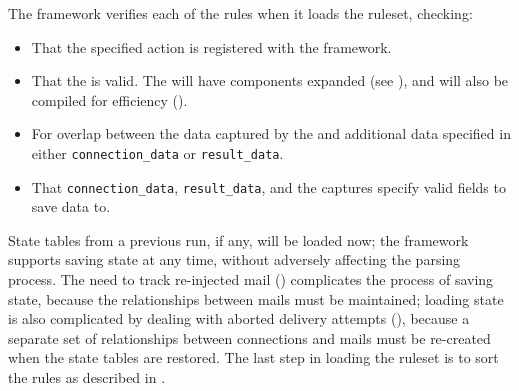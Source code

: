 The framework verifies each of the rules when it loads the ruleset,
checking:

\begin{itemize}

    \squeezeitems{}

    \item That the specified action is registered with the framework.

    \item That the  is valid.  The  will have
         components expanded (see ), and will also be compiled for efficiency
        ().

    \item For overlap between the data captured by the  and
        additional data specified in either \texttt{connection\_data} or
        \texttt{result\_data}.

    \item That \texttt{connection\_data}, \texttt{result\_data}, and the
         captures specify valid fields to save data to.

\end{itemize}

State tables from a previous \parsername{} run, if any, will be loaded now;
the framework supports saving state at any time, without adversely
affecting the parsing process.  The need to track re-injected mail
() complicates the process of saving state,
because the relationships between mails must be maintained; loading state
is also complicated by dealing with aborted delivery attempts
(), because a separate set of
relationships between connections and mails must be re-created when the
state tables are restored.  The last step in loading the ruleset is to sort
the rules as described in .


